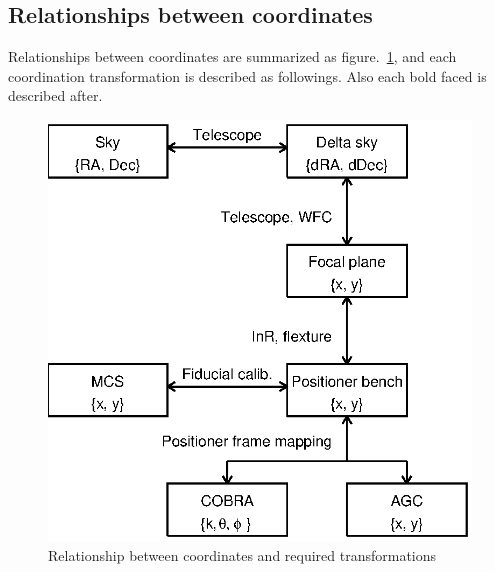 \documentclass[a4paper,notitlepage]{article}
\begin{document}
\subsection{Relationships between coordinates}

Relationships between coordinates are summarized as 
figure.~\ref{fig:coordinate-transform}, and each coordination transformation 
is described as followings. 
Also each bold faced is described after. 

\begin{figure}[htb]
  \begin{center}
    \includegraphics[scale=0.75]{coordinate.eps}
  \end{center}
  \caption{Relationship between coordinates and required transformations}
  \label{fig:coordinate-transform}
\end{figure}
\end{document}
